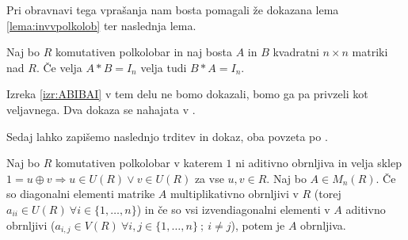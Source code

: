 \documentclass[mat1]{fmfdelo}
\begin{document}
Pri obravnavi tega vprašanja nam bosta pomagali že dokazana lema \ref{lema:invvpolkolob} ter naslednja lema.

\begin{izrek}\label{izr:ABIBAI}
	Naj bo $R$ komutativen polkolobar in naj bosta $A$ in $B$ kvadratni $n\times n$ matriki nad $R$. Če velja $A*B = I_n$ velja tudi $B*A=I_n$.
\end{izrek}

Izreka \ref{izr:ABIBAI} v tem delu ne bomo dokazali, bomo ga pa privzeli kot veljavnega. Dva dokaza se nahajata v \cite[poglavje 3 in poglavje 4]{bib:Reutenauer}.

Sedaj lahko zapišemo naslednjo trditev in dokaz, oba povzeta po \cite[lema 2.\ 3.]{bib:Tanbase}.

\begin{trditev}\label{trd:obrnljMatr}
	Naj bo $R$ komutativen polkolobar v katerem $1$ ni aditivno obrnljiva in velja sklep $1 = u \oplus v \Rightarrow u\in U(R) \lor v\in U(R)$ za vse $u, v \in R$. Naj bo $A\in M_n(R)$. Če so diagonalni elementi matrike $A$ multiplikativno obrnljivi v $R$ (torej $a_{ii}\in U(R)~\forall i \in \{1, \ldots, n\}$) in če so vsi izvendiagonalni elementi v $A$ aditivno obrnljivi ($a_{i,j}\in V(R)~\forall i, j\in \{1, \ldots, n\} ~;~i\neq j$), potem je $A$ obrnljiva.
\end{trditev}
\end{document}
